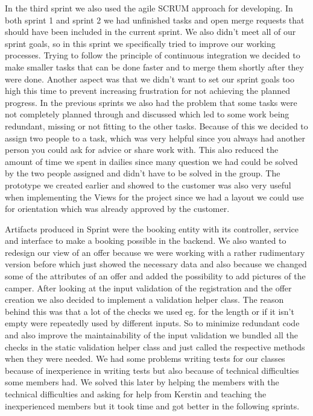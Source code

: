 In the third sprint we also used the agile SCRUM approach for developing.
In both sprint 1 and sprint 2 we had unfinished tasks and open merge requests that should have been included in the current sprint.
We also didn't meet all of our sprint goals, so in this sprint we specifically tried to improve our working processes.
Trying to follow the principle of continuous integration we decided to make smaller tasks that can be done faster and to merge them shortly after they were done.
Another aspect was that we didn't want to set our sprint goals too high this time to prevent increasing frustration for not achieving the planned progress.
In the previous sprints we also had the problem that some tasks were not completely planned through and discussed which led to some work being redundant, missing or not fitting to the other tasks.
Because of this we decided to assign two people to a task, which was very helpful since you always had another person you could ask for advice or share work with.
This also reduced the amount of time we spent in dailies since many question we had could be solved by the two people assigned and didn't have to be solved in the group.
The prototype we created earlier and showed to the customer was also very useful when implementing the Views for the project since we had a layout we could use for orientation which was already approved by the customer.

Artifacts produced in Sprint were the booking entity with its controller, service and interface to make a booking possible in the backend.
We also wanted to redesign our view of an offer because we were working with a rather rudimentary version before which just showed the necessary data and also because we changed some of the attributes of an offer and added the possibility to add pictures of the camper.
After  looking at the input validation of the registration and the offer creation we also decided to implement a validation helper class.
The reason behind this was that a lot of the checks we used eg. for the length or if it isn't empty were repeatedly used by different inputs.
So to minimize redundant code and also improve the maintainability of the input validation we bundled all the checks in the static validation helper class and just called the respective methods when they were needed.
We had some problems writing tests for our classes because of inexperience in writing tests but also because of technical difficulties some members had.
We solved this later by helping the members with the technical difficulties and asking for help from Kerstin and teaching the inexperienced members but it took time and got better in the following sprints.
